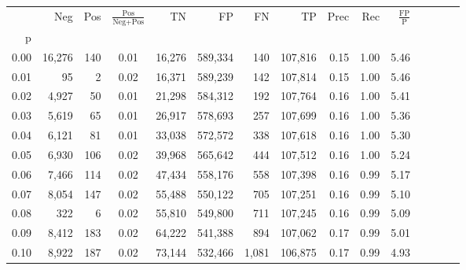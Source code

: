 \begin{tabular}{rrrcrrrrrrrrrrr}
\toprule
{} &     Neg &    Pos & $\frac{\text{Pos}}{\text{Neg}+\text{Pos}}$ &       TN &       FP &       FN &       TP &  Prec &   Rec & $\frac{\text{FP}}{\text{P}}$ \\
p    &         &        &                                            &          &          &          &          &       &       &                              \\
\midrule
0.00 &  16,276 &    140 &                                       0.01 &   16,276 &  589,334 &      140 &  107,816 &  0.15 &  1.00 &                         5.46 \\
0.01 &      95 &      2 &                                       0.02 &   16,371 &  589,239 &      142 &  107,814 &  0.15 &  1.00 &                         5.46 \\
0.02 &   4,927 &     50 &                                       0.01 &   21,298 &  584,312 &      192 &  107,764 &  0.16 &  1.00 &                         5.41 \\
0.03 &   5,619 &     65 &                                       0.01 &   26,917 &  578,693 &      257 &  107,699 &  0.16 &  1.00 &                         5.36 \\
0.04 &   6,121 &     81 &                                       0.01 &   33,038 &  572,572 &      338 &  107,618 &  0.16 &  1.00 &                         5.30 \\
0.05 &   6,930 &    106 &                                       0.02 &   39,968 &  565,642 &      444 &  107,512 &  0.16 &  1.00 &                         5.24 \\
0.06 &   7,466 &    114 &                                       0.02 &   47,434 &  558,176 &      558 &  107,398 &  0.16 &  0.99 &                         5.17 \\
0.07 &   8,054 &    147 &                                       0.02 &   55,488 &  550,122 &      705 &  107,251 &  0.16 &  0.99 &                         5.10 \\
0.08 &     322 &      6 &                                       0.02 &   55,810 &  549,800 &      711 &  107,245 &  0.16 &  0.99 &                         5.09 \\
0.09 &   8,412 &    183 &                                       0.02 &   64,222 &  541,388 &      894 &  107,062 &  0.17 &  0.99 &                         5.01 \\
0.10 &   8,922 &    187 &                                       0.02 &   73,144 &  532,466 &    1,081 &  106,875 &  0.17 &  0.99 &                         4.93 \\

\end{tabular}
